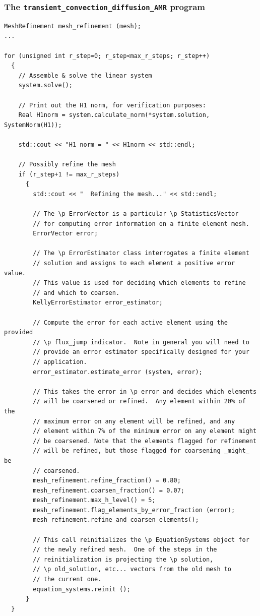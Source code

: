 \frame
{
  \Large
  \begin{block}{}
  \end{block}
}

\begin{frame}[fragile]
  \frametitle{The \texttt{transient\_convection\_diffusion\_AMR} program}
    \begin{lstlisting}
MeshRefinement mesh_refinement (mesh);
...

for (unsigned int r_step=0; r_step<max_r_steps; r_step++)
  {
    // Assemble & solve the linear system
    system.solve();

    // Print out the H1 norm, for verification purposes:
    Real H1norm = system.calculate_norm(*system.solution, SystemNorm(H1));

    std::cout << "H1 norm = " << H1norm << std::endl;

    // Possibly refine the mesh
    if (r_step+1 != max_r_steps)
      {
        std::cout << "  Refining the mesh..." << std::endl;

        // The \p ErrorVector is a particular \p StatisticsVector
        // for computing error information on a finite element mesh.
        ErrorVector error;

        // The \p ErrorEstimator class interrogates a finite element
        // solution and assigns to each element a positive error value.
        // This value is used for deciding which elements to refine
        // and which to coarsen.
        KellyErrorEstimator error_estimator;

        // Compute the error for each active element using the provided
        // \p flux_jump indicator.  Note in general you will need to
        // provide an error estimator specifically designed for your
        // application.
        error_estimator.estimate_error (system, error);

        // This takes the error in \p error and decides which elements
        // will be coarsened or refined.  Any element within 20% of the
        // maximum error on any element will be refined, and any
        // element within 7% of the minimum error on any element might
        // be coarsened. Note that the elements flagged for refinement
        // will be refined, but those flagged for coarsening _might_ be
        // coarsened.
        mesh_refinement.refine_fraction() = 0.80;
        mesh_refinement.coarsen_fraction() = 0.07;
        mesh_refinement.max_h_level() = 5;
        mesh_refinement.flag_elements_by_error_fraction (error);
        mesh_refinement.refine_and_coarsen_elements();

        // This call reinitializes the \p EquationSystems object for
        // the newly refined mesh.  One of the steps in the
        // reinitialization is projecting the \p solution,
        // \p old_solution, etc... vectors from the old mesh to
        // the current one.
        equation_systems.reinit ();
      }
  }
    \end{lstlisting}
\end{frame}
    
